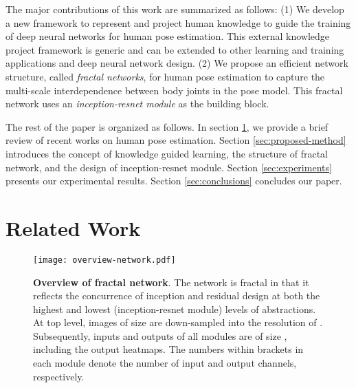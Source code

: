 \documentclass[journal ]{IEEEtran}
\begin{document}
The major contributions of this work are summarized as follows:
(1) We develop a new framework to represent and project human knowledge to guide the training of deep neural networks for human pose estimation. This external knowledge project framework is generic and can be extended to other learning and training applications and deep neural network design. 
(2) We propose an efficient network structure, called {\it fractal networks}, for human pose estimation to capture the multi-scale interdependence between body joints in the pose model. This fractal network uses an \textit{inception-resnet module} as the building block.

The rest of the paper is organized as follows.
In section \ref{sec:related-work}, we provide a brief review of recent works on human pose estimation. Section \ref{sec:proposed-method} introduces the concept of knowledge guided learning, the structure of fractal network, and the design of inception-resnet module. Section \ref{sec:experiments} presents our experimental results. Section \ref{sec:conclusions} concludes our paper.

















\section{Related Work}
\label{sec:related-work}

\begin{figure*}
	\begin{center}
		\texttt{[image: overview-network.pdf]}
	\end{center}
	\caption{\textbf{Overview of fractal network}. The network is fractal in that it reflects the concurrence of inception and residual design at both the highest and lowest (inception-resnet module) levels of abstractions. At top level, images of size  are down-sampled into the resolution of . Subsequently, inputs and outputs of all modules are of size , including the output heatmaps. The numbers within brackets in each module denote the number of input and output channels, respectively.}
	\label{fig:overview}
\end{figure*}
\end{document}
